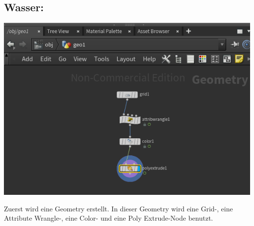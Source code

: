 \documentclass[paper=a4,fontsize=12pt,ngerman]{scrartcl}
\begin{document}
	 
	
	
	\subsection*{Wasser:}
	\begin{minipage}{0.5\textwidth}
		\includegraphics[width=\textwidth]{graphics/wasser_1.png}
	\end{minipage}
	\begin{minipage}{0.5\textwidth}
		Zuerst wird eine Geometry erstellt. In dieser Geometry wird eine Grid-, eine Attribute Wrangle-, eine Color- und eine Poly Extrude-Node benutzt.
	\end{minipage}
	
\end{document}
